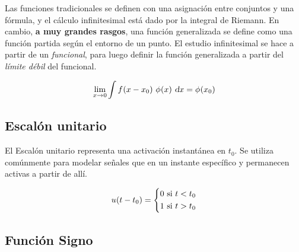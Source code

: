 Las funciones tradicionales se definen con una asignación entre conjuntos y una fórmula, y el cálculo infinitesimal está dado por la integral de Riemann.
En cambio, \textbf{a muy grandes rasgos}, una función generalizada se define como una función partida según el entorno de un punto.
El estudio infinitesimal se hace a partir de un \emph{funcional}, para luego definir la función generalizada a partir del \emph{límite débil} del funcional.

\begin{mdframed}[style=PropertyFrame]
    \begin{prop}
        \label{prop:limDebil}
    \end{prop}
    \begin{equation*}
        \lim_{x \to 0}{\int \fx{x-x_0} \, \fx[\phi]{x} \, \dif x} = \fx[\phi]{x_0}
    \end{equation*}
\end{mdframed}

\subsection{Escalón unitario}

El Escalón unitario representa una activación instantánea en $t_0$.
Se utiliza comúnmente para modelar señales que  en un instante específico y permanecen activas a partir de allí.

\begin{mdframed}[style=DefinitionFrame]
    \begin{defn}
    \end{defn}
    \[
        \fx[u]{t - t_0} =
        \left\{
        \begin{aligned}
            0 \text{ si $t < t_0$}
            \\
            1 \text{ si $t > t_0$}
        \end{aligned}
        \right.
    \]
\end{mdframed}

\begin{center}
    \def\svgwidth{0.6\linewidth}
    
\end{center}

\subsection{Función Signo}

